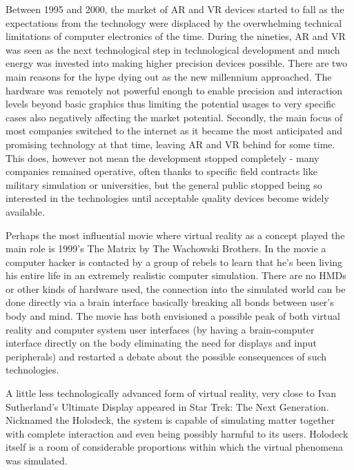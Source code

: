 \documentclass[12pt, a4paper]{article}
\begin{document}
Between 1995 and 2000, the market of AR and VR devices started to fall as the expectations from the technology were displaced by the overwhelming technical limitations of computer electronics of the time. During the nineties, AR and VR was seen as the next technological step in technological development and much energy was invested into making higher precision devices possible. There are two main reasons for the hype dying out as the new millennium approached. The hardware was remotely not powerful enough to enable precision and interaction levels beyond basic graphics thus limiting the potential usages to very specific cases also negatively affecting the market potential. Secondly, the main focus of most companies switched to the internet as it became the most anticipated and promising technology at that time, leaving AR and VR behind for some time. This does, however not mean the development stopped completely - many companies remained operative, often thanks to specific field contracts like military simulation or universities, but the general public stopped being so interested in the technologies until acceptable quality devices become widely available.

Perhaps the most influential movie where virtual reality as a concept played the main role is 1999’s The Matrix by The Wachowski Brothers. In the movie a computer hacker is contacted by a group of rebels to learn that he’s been living his entire life in an extremely realistic computer simulation. There are no HMDs or other kinds of hardware used, the connection into the simulated world can be done directly via a brain interface basically breaking all bonds between user’s body and mind. The movie has both envisioned a possible peak of both virtual reality and computer system user interfaces (by having a brain-computer interface directly on the body eliminating the need for displays and input peripherals) and restarted a debate about the possible consequences of such technologies.

A little less technologically advanced form of virtual reality, very close to Ivan Sutherland’s Ultimate Display appeared in Star Trek: The Next Generation. Nicknamed the Holodeck, the system is capable of simulating matter together with complete interaction and even being possibly harmful to its users. Holodeck itself is a room of considerable proportions within which the virtual phenomena was simulated.
\end{document}
